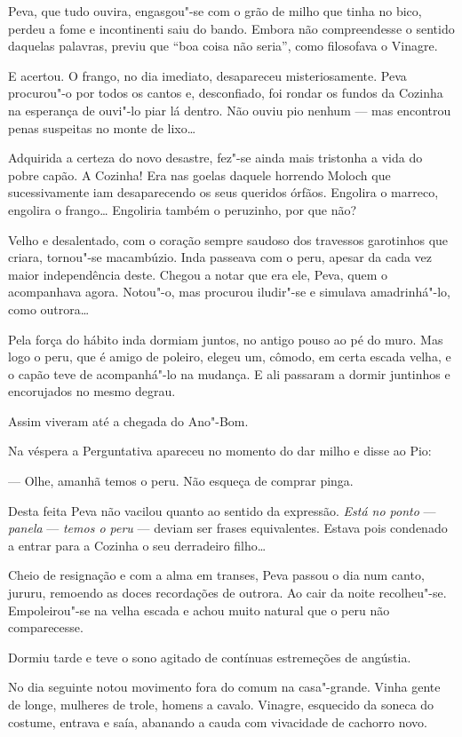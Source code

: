 Peva, que tudo ouvira, engasgou"-se com o grão de milho que tinha no
bico, perdeu a fome e incontinenti saiu do bando. Embora não
compreendesse o sentido daquelas palavras, previu que ``boa coisa não
seria'', como filosofava o Vinagre.

E acertou. O frango, no dia imediato, desapareceu misteriosamente. Peva
procurou"-o por todos os cantos e, desconfiado, foi rondar os fundos da
Cozinha na esperança de ouvi"-lo piar lá dentro. Não ouviu pio nenhum ---
mas encontrou penas suspeitas no monte de lixo\ldots{}

Adquirida a certeza do novo desastre, fez"-se ainda mais tristonha a vida
do pobre capão. A Cozinha! Era nas goelas daquele horrendo Moloch que
sucessivamente iam desaparecendo os seus queridos órfãos. Engolira o
marreco, engolira o frango\ldots{} Engoliria também o peruzinho, por que não?

Velho e desalentado, com o coração sempre saudoso dos travessos
garotinhos que criara, tornou"-se macambúzio. Inda passeava com o peru,
apesar da cada vez maior independência deste. Chegou a notar que era
ele, Peva, quem o acompanhava agora. Notou"-o, mas procurou iludir"-se e
simulava amadrinhá"-lo, como outrora\ldots{}

Pela força do hábito inda dormiam juntos, no antigo pouso ao pé do muro.
Mas logo o peru, que é amigo de poleiro, elegeu um, cômodo, em certa
escada velha, e o capão teve de acompanhá"-lo na mudança. E ali passaram
a dormir juntinhos e encorujados no mesmo degrau.

Assim viveram até a chegada do Ano"-Bom.

Na véspera a Perguntativa apareceu no momento do dar milho e disse ao
Pio:

--- Olhe, amanhã temos o peru. Não esqueça de comprar pinga.

Desta feita Peva não vacilou quanto ao sentido da expressão. \emph{Está
no ponto} --- \emph{panela} --- \emph{temos o peru} --- deviam ser
frases equivalentes. Estava pois condenado a entrar para a Cozinha o seu
derradeiro filho\ldots{}

Cheio de resignação e com a alma em transes, Peva passou o dia num
canto, jururu, remoendo as doces recordações de outrora. Ao cair da
noite recolheu"-se. Empoleirou"-se na velha escada e achou muito natural
que o peru não comparecesse.

Dormiu tarde e teve o sono agitado de contínuas estremeções de angústia.

No dia seguinte notou movimento fora do comum na casa"-grande. Vinha
gente de longe, mulheres de trole, homens a cavalo. Vinagre, esquecido
da soneca do costume, entrava e saía, abanando a cauda com vivacidade de
cachorro novo.

